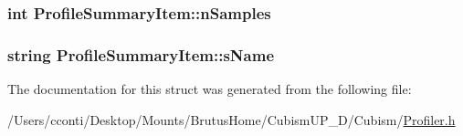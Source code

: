 \subsubsection[{n\+Samples}]{\setlength{\rightskip}{0pt plus 5cm}int Profile\+Summary\+Item\+::n\+Samples}\label{struct_profile_summary_item_adb8b4578844aaa85bd0bd7f970e23959}
\hypertarget{struct_profile_summary_item_ae37c58451ea8907b3b6580066bf48a71}{}
\subsubsection[{s\+Name}]{\setlength{\rightskip}{0pt plus 5cm}string Profile\+Summary\+Item\+::s\+Name}\label{struct_profile_summary_item_ae37c58451ea8907b3b6580066bf48a71}


The documentation for this struct was generated from the following file\+:\begin{DoxyCompactItemize}
\item 
/\+Users/cconti/\+Desktop/\+Mounts/\+Brutus\+Home/\+Cubism\+U\+P\+\_\+D/\+Cubism/\hyperlink{_profiler_8h}{Profiler.\+h}\end{DoxyCompactItemize}
